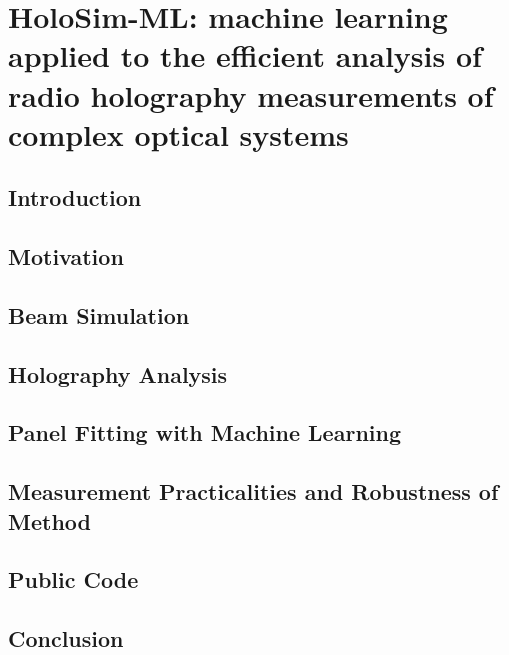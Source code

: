 \chapter{HoloSim-ML: machine learning applied to the efficient analysis of radio holography measurements of complex optical systems}
\label{ch:holosim}
\section{Introduction}
\section{Motivation}
\section{Beam Simulation}
\section{Holography Analysis}
\section{Panel Fitting with Machine Learning}
\section{Measurement Practicalities and Robustness of Method}
\section{Public Code}
\section{Conclusion}